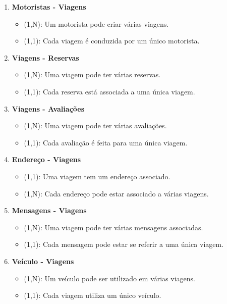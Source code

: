 \begin{enumerate}
	\item \textbf{Motoristas - Viagens}
	\begin{itemize}
		\item (1,N): Um motorista pode criar várias viagens.
		\item (1,1): Cada viagem é conduzida por um único motorista.
	\end{itemize}
	
	\item \textbf{Viagens - Reservas}
	\begin{itemize}
		\item (1,N): Uma viagem pode ter várias reservas.
		\item (1,1): Cada reserva está associada a uma única viagem.
	\end{itemize}
	
	\item \textbf{Viagens - Avaliações}
	\begin{itemize}
		\item (1,N): Uma viagem pode ter várias avaliações.
		\item (1,1): Cada avaliação é feita para uma única viagem.
	\end{itemize}
	
	\item \textbf{Endereço - Viagens}
	\begin{itemize}
		\item (1,1): Uma viagem tem um endereço associado.
		\item (1,N): Cada endereço pode estar associado a várias viagens.
	\end{itemize}
	
	\item \textbf{Mensagens - Viagens}
	\begin{itemize}
		\item (1,N): Uma viagem pode ter várias mensagens associadas.
		\item (1,1): Cada mensagem pode estar se referir a uma única viagem.
	\end{itemize}
	
	\item \textbf{Veículo - Viagens}
	\begin{itemize}
		\item (1,N): Um veículo pode ser utilizado em várias viagens.
		\item (1,1): Cada viagem utiliza um único veículo.
	\end{itemize}
\end{enumerate}

